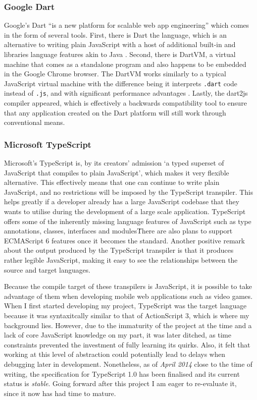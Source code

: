 \documentclass[final]{cmpreport}
\begin{document}
\subsubsection{Google Dart}
Google's Dart ``is a new platform for scalable web app engineering'' which comes in the form of several tools. First, there is Dart the language, which is an alternative to writing plain JavaScript with a host of additional built-in and libraries language features akin to Java \citep{Fortuna}. Second, there is DartVM, a virtual machine that comes as a standalone program and also happens to be embedded in the Google Chrome browser. The DartVM works similarly to a typical JavaScript virtual machine with the difference being it interprets \texttt{.dart} code instead of \texttt{.js}, and with significant performance advantages \citep{Schneider}. Lastly, the dart2js compiler appeared, which is effectively a backwards compatibility tool to ensure that any application created on the Dart platform will still work through conventional means.

\subsubsection{Microsoft TypeScript}
Microsoft's TypeScript is, by its creators' admission `a typed superset of JavaScript that compiles to plain JavaScript', which makes it very flexible alternative. This effectively means that one can continue to write plain JavaScript, and no restrictions will be imposed by the TypeScript transpiler. This helps greatly if a developer already has a large JavaScript codebase that they wants to utilise during the development of a large scale application. TypeScript offers some of the inherently missing language features of JavaScript such as type annotations, classes, interfaces and modules\. There are also plans to support ECMAScript 6 features once it becomes the standard. Another positive remark about the output produced by the TypeScript transpiler is that it produces rather legible JavaScript, making it easy to see the relationships between the source and target languages.

Because the compile target of these transpilers is JavaScript, it is possible to take advantage of them when developing mobile web applications such as video games. When I first started developing my project, TypeScript was the target language because it was syntaxitcally similar to that of ActionScript 3, which is where my background lies. However, due to the immaturity of the project at the time and a lack of core JavaScript knowledge on my part, it was later ditched, as time constraints prevented the investment of fully learning its quirks. Also, it felt that working at this level of abstraction could potentially lead to delays when debugging later in development. Nonetheless, as of \textit{April 2014} close to the time of writing, the specification for TypeScript 1.0 \footnotemark has been finalised and its current status is \textit{stable}. Going forward after this project I am eager to re-evaluate it, since it now has had time to mature.
\end{document}
